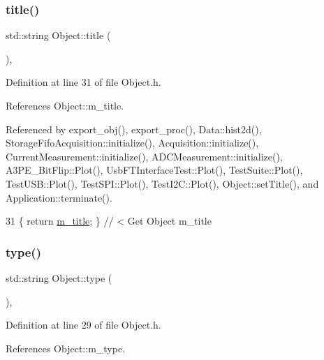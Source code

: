 \subsubsection{\texorpdfstring{title()}{title()}}
{\footnotesize\ttfamily std\+::string Object\+::title (\begin{DoxyParamCaption}{ }\end{DoxyParamCaption})\hspace{0.3cm}{\ttfamily [inline]}, {\ttfamily [inherited]}}



Definition at line 31 of file Object.\+h.



References Object\+::m\+\_\+title.



Referenced by export\+\_\+obj(), export\+\_\+proc(), Data\+::hist2d(), Storage\+Fifo\+Acquisition\+::initialize(), Acquisition\+::initialize(), Current\+Measurement\+::initialize(), A\+D\+C\+Measurement\+::initialize(), A3\+P\+E\+\_\+\+Bit\+Flip\+::\+Plot(), Usb\+F\+T\+Interface\+Test\+::\+Plot(), Test\+Suite\+::\+Plot(), Test\+U\+S\+B\+::\+Plot(), Test\+S\+P\+I\+::\+Plot(), Test\+I2\+C\+::\+Plot(), Object\+::set\+Title(), and Application\+::terminate().


\begin{DoxyCode}
31 \{ \textcolor{keywordflow}{return} \hyperlink{classObject_affbeea1953eb5163573b92fad8f75727}{m\_title};      \} \textcolor{comment}{// < Get Object m\_title}
\end{DoxyCode}
\mbox{\label{classObject_a84f99f70f144a83e1582d1d0f84e4e62}} 
\subsubsection{\texorpdfstring{type()}{type()}}
{\footnotesize\ttfamily std\+::string Object\+::type (\begin{DoxyParamCaption}{ }\end{DoxyParamCaption})\hspace{0.3cm}{\ttfamily [inline]}, {\ttfamily [inherited]}}



Definition at line 29 of file Object.\+h.



References Object\+::m\+\_\+type.



